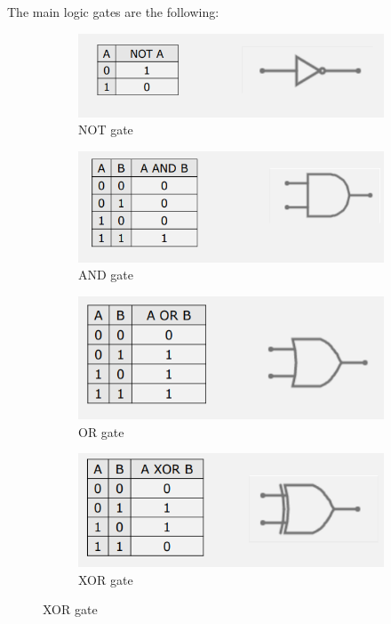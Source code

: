\documentclass{article}
\begin{document}
The main logic gates are the following:

\begin{figure}[h]

    \centering
    \begin{subfigure}{.49\textwidth}
        \centering
        \includegraphics[width=\linewidth]{IM_NOT.PNG}
        \caption{NOT gate}
        \label{NOT}
    \end{subfigure}
    \hfill
    \begin{subfigure}{.49\textwidth}
        \centering
        \includegraphics[width=\linewidth]{IM_AND.PNG}
        \caption{AND gate}
        \label{AND}        
    \end{subfigure}
    
    \centering
    \begin{subfigure}{.49\textwidth}
        \centering
        \includegraphics[width=\linewidth]{IM_OR.PNG}
        \caption{OR gate}
        \label{OR}
    \end{subfigure}
    \hfill
    \begin{subfigure}{.49\textwidth}
        \centering
        \includegraphics[width=\linewidth]{IM_XOR.PNG}
        \caption{XOR gate}
        \label{XOR}        
    \end{subfigure}
    

\end{figure}
\end{document}
